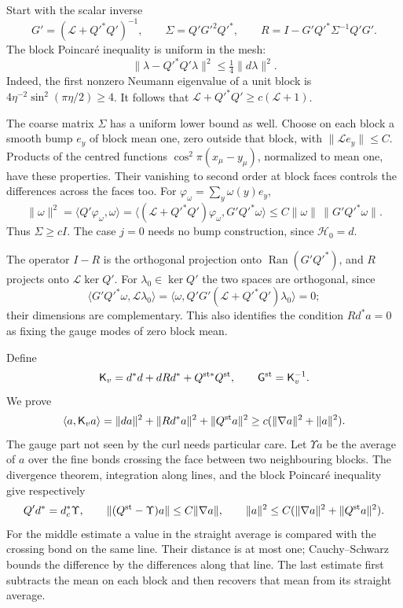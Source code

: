 \documentclass[11pt,letterpaper,reqno]{amsart}
\theoremstyle{definition}
\theoremstyle{remark}
\begin{document}
Start with the scalar inverse
\[
 G'=(\mathcal L+Q'^*Q')^{-1},\qquad
 \Sigma=Q'G'^2Q'^*,\qquad
 R=I-G'Q'^*\Sigma^{-1}Q'G'.
\]
The block Poincar\'e inequality is uniform in the mesh:
\[
 \|\lambda-Q'^*Q'\lambda\|^2
       \le\tfrac14\|d\lambda\|^2.
\]
Indeed, the first nonzero Neumann eigenvalue of a unit block is
$4\eta^{-2}\sin^2(\pi\eta/2)\ge4$. It follows that
$\mathcal L+Q'^*Q'\ge c(\mathcal L+1)$.

The coarse matrix $\Sigma$ has a uniform lower bound as well.
Choose on each block a smooth bump $e_y$ of block mean one, zero
outside that block, with $\|\mathcal Le_y\|\le C$. Products of
the centred functions $\cos^2\pi(x_\mu-y_\mu)$, normalized to
mean one, have these properties. Their vanishing to second order
at block faces controls the differences across the faces too.
For $\varphi_\omega=\sum_y\omega(y)e_y$,
\[
 \|\omega\|^2
 =\langle Q'\varphi_\omega,\omega\rangle
 =\langle(\mathcal L+Q'^*Q')\varphi_\omega,
                                      G'Q'^*\omega\rangle
 \le C\|\omega\|\,\|G'Q'^*\omega\|.
\]
Thus $\Sigma\ge cI$. The case $j=0$ needs no bump construction,
since $\mathcal H_0=d$.

The operator $I-R$ is the orthogonal projection onto
$\operatorname{Ran}(G'Q'^*)$, and $R$ projects onto
$\mathcal L\ker Q'$. For $\lambda_0\in\ker Q'$ the two
spaces are orthogonal, since
\[
 \langle G'Q'^*\omega,\mathcal L\lambda_0\rangle
 =\langle\omega,Q'G'(\mathcal L+Q'^*Q')\lambda_0\rangle=0;
\]
their dimensions are complementary. This also identifies the
condition $Rd^*a=0$ as fixing the gauge modes of zero block mean.

Define
\[
 \mathsf K_v=d^*d+dRd^*+Q^{{\rm st}*}Q^{\rm st},\qquad
 \mathsf G^{\rm st}=\mathsf K_v^{-1}.
\]
We prove
\[
 \langle a,\mathsf K_va\rangle
 =\|da\|^2+\|Rd^*a\|^2+\|Q^{\rm st}a\|^2
 \ge c(\|\nabla a\|^2+\|a\|^2).
\]
The gauge part not seen by the curl needs particular care. Let
$\Upsilon a$ be the average of $a$ over the fine bonds crossing
the face between two neighbouring blocks. The divergence theorem,
integration along lines, and the block Poincar\'e inequality give
respectively
\[
 Q'd^*=d_c^*\Upsilon,\qquad
 \|(Q^{\rm st}-\Upsilon)a\|\le C\|\nabla a\|,\qquad
 \|a\|^2\le C(\|\nabla a\|^2+\|Q^{\rm st}a\|^2).
\]
For the middle estimate a value in the straight average is compared
with the crossing bond on the same line. Their distance is at most
one; Cauchy--Schwarz bounds the difference by the differences along
that line. The last estimate first subtracts the mean on each block
and then recovers that mean from its straight average.
\end{document}
